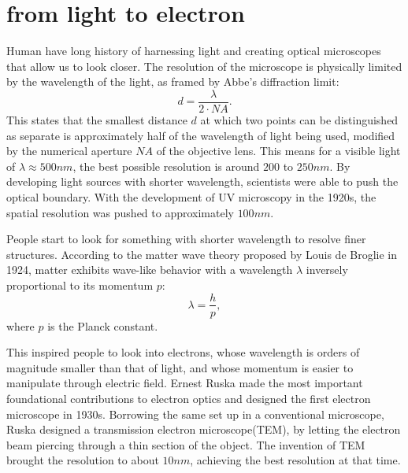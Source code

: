 \section{from light to electron}
Human have long history of harnessing light and creating optical microscopes that allow us to look closer. The resolution of the microscope is physically limited by the wavelength of the light, as framed by Abbe's diffraction limit:
\begin{equation}
	d = \frac{\lambda}{2\cdot NA}.
\end{equation}
This states that the smallest distance $d$ at which two points can be distinguished as separate is approximately half of the wavelength of light being used, modified by the numerical aperture $NA$ of the objective lens. This means for a visible light of $\lambda \approx 500nm$, the best possible resolution is around $200$ to $250nm$. By developing light sources with shorter wavelength, scientists were able to push the optical boundary. With the development of UV microscopy in the 1920s, the spatial resolution was pushed to approximately $100nm$. 

People start to look for something with shorter wavelength to resolve finer structures. According to the matter wave theory proposed by Louis de Broglie in 1924, matter exhibits wave-like behavior with a wavelength $\lambda$ inversely proportional to its momentum $p$: 
\begin{equation}
	\lambda = \frac{h}{p},
\end{equation}
where $p$ is the Planck constant. 

This inspired people to look into electrons, whose wavelength is orders of magnitude smaller than that of light, and whose momentum is easier to manipulate through electric field. Ernest Ruska made the most important foundational contributions to electron optics and designed the first electron microscope in 1930s. Borrowing the same set up in a conventional microscope, Ruska designed a transmission electron microscope(TEM), by letting the electron beam piercing through a thin section of the object. The invention of TEM brought the resolution to about $10nm$, achieving the best resolution at that time. 

